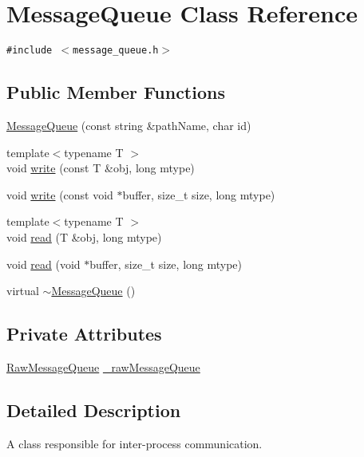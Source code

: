 \hypertarget{classMessageQueue}{
\section{MessageQueue Class Reference}
\label{classMessageQueue}
}
{\tt \#include $<$message\_\-queue.h$>$}

\subsection*{Public Member Functions}
\begin{CompactItemize}
\item 
\hyperlink{classMessageQueue_9f9fba196c790b1c6ffc8942bfd2227a}{MessageQueue} (const string \&pathName, char id)
\item 
{\footnotesize template$<$typename T $>$ }\\void \hyperlink{classMessageQueue_f92446b6f5dff6ffb4f523c85c066ad9}{write} (const T \&obj, long mtype)
\item 
void \hyperlink{classMessageQueue_b0a94ebdfdd9163fce40657e2fbfd891}{write} (const void $\ast$buffer, size\_\-t size, long mtype)
\item 
{\footnotesize template$<$typename T $>$ }\\void \hyperlink{classMessageQueue_81d59fbb3d8ad809a37e0f9a56a90fc6}{read} (T \&obj, long mtype)
\item 
void \hyperlink{classMessageQueue_1ce5443461c439d7d564f0d04d44d812}{read} (void $\ast$buffer, size\_\-t size, long mtype)
\item 
virtual \hyperlink{classMessageQueue_63b519d0981515633e3d1ae8358f4e94}{$\sim$MessageQueue} ()
\end{CompactItemize}
\subsection*{Private Attributes}
\begin{CompactItemize}
\item 
\hyperlink{classRawMessageQueue}{RawMessageQueue} \hyperlink{classMessageQueue_28ee84422ed78459c2e92909c99dc1f4}{\_\-rawMessageQueue}
\end{CompactItemize}


\subsection{Detailed Description}
A class responsible for inter-process communication. 

